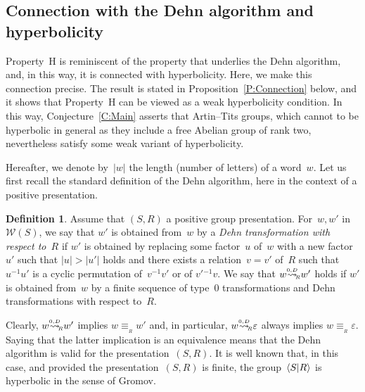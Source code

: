 \documentclass{amsart}
\numberwithin{equation}{section}
\theoremstyle{plain}
\theoremstyle{definition}
\newtheorem{defi}[prop]{Definition}
\begin{document}
\subsection{Connection with the Dehn algorithm and hyperbolicity}
\label{SS:Dehn}

Property~${\mathrm{H}}$ is reminiscent of the property that underlies the Dehn algorithm, and, in this way, it is connected with hyperbolicity. Here, we make this connection precise. The result is stated in Proposition~\ref{P:Connection} below, and it shows that Property~${\mathrm{H}}$ can be viewed as a weak hyperbolicity condition. In this way, Conjecture~\ref{C:Main} asserts that Artin--Tits groups, which cannot to be hyperbolic in general as they include a free Abelian group of rank two, nevertheless satisfy some weak variant of hyperbolicity.

Hereafter, we denote by~${\vert{w}\vert}$ the length (number of letters) of a word~${w}$. Let us first recall the standard definition of the Dehn algorithm, here in the context of a positive presentation. 
 
\begin{defi} 
\label{D:Dehn}
Assume that $({S}, {R})$ a positive group presentation. For~${w}, {w}'$ in~${\mathcal{W}({S})}$, we say that ${w}'$ is obtained from~${w}$ by a \emph{Dehn transformation with respect to~${R}$} if ${w}'$ is obtained by replacing some factor~${u}$ of~${w}$ with a new factor~${u}'$ such that ${\vert{u}\vert} > {\vert{{u}'}\vert}$ holds and there exists a relation~${v} = {v}'$ of~${R}$ such that ${u}{^{-1}} {u}'$ is a cyclic permutation of~${v}{^{-1}} {v}'$ or of ${v}'{}{^{-1}} {v}$. We say that ${w} {\mathrel{{\mathrel{\overset{\scriptscriptstyle 0,D}{\rightsquigarrow}}}_{\hspace{-0.6ex}{\scriptscriptstyle R}}}} {w}'$ holds if ${w}'$ is obtained from~${w}$ by a finite sequence of type~$0$ transformations and Dehn transformations with respect to~${R}$. 
\end{defi}

Clearly, ${w} {\mathrel{{\mathrel{\overset{\scriptscriptstyle 0,D}{\rightsquigarrow}}}_{\hspace{-0.6ex}{\scriptscriptstyle R}}}} {w}'$ implies ${w} {\equiv_{{\!{}_{R}}}} {w}'$ and, in particular, ${w} {\mathrel{{\mathrel{\overset{\scriptscriptstyle 0,D}{\rightsquigarrow}}}_{\hspace{-0.6ex}{\scriptscriptstyle R}}}} {\varepsilon}$ always implies ${w} {\equiv_{{\!{}_{R}}}} {\varepsilon}$. Saying that the latter implication is an equivalence means that the Dehn algorithm is valid for the presentation~$({S}, {R})$. It is well known \cite{GHV,Can,Lys} that, in this case, and provided the presentation~$({S}, {R})$ is finite, the group~${\langle{S}{\mid}\nobreak{R}\rangle}$ is hyperbolic in the sense of Gromov.
\end{document}
